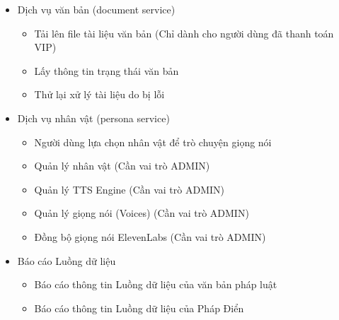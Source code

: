 

\begin{itemize}


\item Dịch vụ văn bản (document service)
\begin{itemize}
\item Tải lên file tài liệu văn bản (Chỉ dành cho người dùng đã thanh toán VIP)
\item Lấy thông tin trạng thái văn bản
\item Thử lại xử lý tài liệu do bị lỗi
\end{itemize}




\item Dịch vụ nhân vật (persona service)
\begin{itemize}
\item Người dùng lựa chọn nhân vật để trò chuyện giọng nói
\item Quản lý nhân vật (Cần vai trò ADMIN)
\item Quản lý TTS Engine (Cần vai trò ADMIN)
\item Quản lý giọng nói (Voices) (Cần vai trò ADMIN)
\item Đồng bộ giọng nói ElevenLabs (Cần vai trò ADMIN)
\end{itemize}


\item Báo cáo Luồng dữ liệu
\begin{itemize}
\item Báo cáo thông tin Luồng dữ liệu của văn bản pháp luật
\item Báo cáo thông tin Luồng dữ liệu của Pháp Điển
\end{itemize}


\end{itemize}
